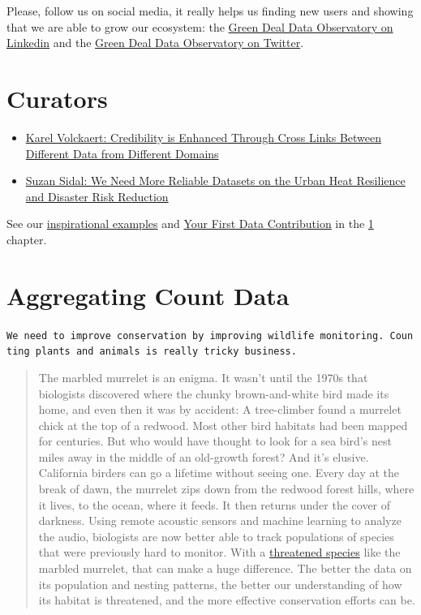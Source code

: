 \documentclass[
  a4paper,
  openany, a4paper, oneside]{book}
\providecommand{\tightlist}{%
  \setlength{\itemsep}{0pt}\setlength{\parskip}{0pt}}
\begin{document}
Please, follow us on social media, it really helps us finding new users and showing that we are able to grow our ecosystem: the \href{https://www.linkedin.com/company/78556699}{Green Deal Data Observatory on Linkedin} and the \href{https://twitter.com/GreenDealObs}{Green Deal Data Observatory on Twitter}.

\hypertarget{curators}{%
\section{Curators}\label{curators}}

\begin{itemize}
\tightlist
\item
  \href{https://greendeal.dataobservatory.eu/post/2021-06-08-data-curator-karel-volckaert/}{Karel Volckaert: Credibility is Enhanced Through Cross Links Between Different Data from Different Domains}
\item
  \href{https://greendeal.dataobservatory.eu/post/2021-06-07-introducing-suzan-sidal/}{Suzan Sidal: We Need More Reliable Datasets on the Urban Heat Resilience and Disaster Risk Reduction}
\end{itemize}

See our \href{\%7B\#get-inspired\%7D}{inspirational examples} and \protect\hyperlink{first-contribution}{Your First Data Contribution} in the \ref{curators} chapter.

\hypertarget{aggregating-count-data}{%
\section{Aggregating Count Data}\label{aggregating-count-data}}

\texttt{We\ need\ to\ improve\ conservation\ by\ improving\ wildlife\ monitoring.\ Counting\ plants\ and\ animals\ is\ really\ tricky\ business.}

\begin{quote}
The marbled murrelet is an enigma. It wasn't until the 1970s that biologists discovered where the chunky brown-and-white bird made its home, and even then it was by accident: A tree-climber found a murrelet chick at the top of a redwood. Most other bird habitats had been mapped for centuries. But who would have thought to look for a sea bird's nest miles away in the middle of an old-growth forest?
And it's elusive. California birders can go a lifetime without seeing one. Every day at the break of dawn, the murrelet zips down from the redwood forest hills, where it lives, to the ocean, where it feeds. It then returns under the cover of darkness.
Using remote acoustic sensors and machine learning to analyze the audio, biologists are now better able to track populations of species that were previously hard to monitor. With a \href{https://www.fws.gov/arcata/es/birds/MM/m_murrelet.html}{threatened species} like the marbled murrelet, that can make a huge difference. The better the data on its population and nesting patterns, the better our understanding of how its habitat is threatened, and the more effective conservation efforts can be.
\end{quote}
\end{document}
